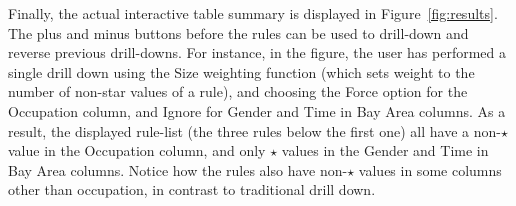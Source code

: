 Finally, the actual interactive table summary is displayed in Figure~\ref{fig:results}. The plus and minus buttons before the rules can be used to drill-down and reverse previous drill-downs. For instance, in the figure, the user has performed a single drill down using the Size weighting function (which sets weight to the number of non-star values of a rule), and choosing the Force option for the Occupation column, and Ignore for Gender and Time in Bay Area columns. As a result, the displayed rule-list (the three rules below the first one) all have a non-$\star$ value in the Occupation column, and only $\star$ values in the Gender and Time in Bay Area columns. Notice how the rules also have non-$\star$ values in some columns other than occupation, in contrast to traditional drill down.